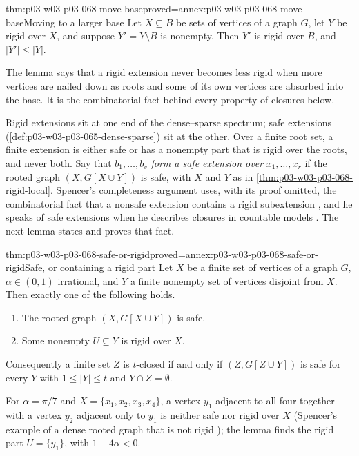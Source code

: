 \begin{hblemma}{thm:p03-w03-p03-068-move-base}{proved=annex:p03-w03-p03-068-move-base}{Moving to a larger base}
Let \(X\subseteq B\) be sets of vertices of a graph \(G\), let \(Y\) be rigid
over \(X\), and suppose \(Y'=Y\setminus B\) is nonempty.  Then \(Y'\) is
rigid over \(B\), and \(|Y'|\leq|Y|\).
\end{hblemma}

The lemma says that a rigid extension never becomes less rigid when more
vertices are nailed down as roots and some of its own vertices are absorbed
into the base.  It is the combinatorial fact behind every property of
closures below.

Rigid extensions sit at one end of the dense--sparse spectrum; safe
extensions (\cref{def:p03-w03-p03-065-dense-sparse}) sit at the other.
Over a finite root set, a finite extension is either safe or has a nonempty
part that is rigid over the roots, and never both.  Say that \(b_1,\ldots,b_v\) \emph{form a safe
extension over} \(x_1,\ldots,x_r\) if the rooted graph
\((X,G[X\cup Y])\) is safe, with \(X\) and \(Y\) as in
\cref{thm:p03-w03-p03-068-rigid-local}.  Spencer's completeness argument
uses, with its proof omitted, the combinatorial fact that a nonsafe
extension contains a rigid subextension
\cite[p.~12]{Spencer2007LogicRandomStructuresAuthor}, and he speaks of
safe extensions when he describes closures in countable models
\cite[p.~15]{Spencer2007LogicRandomStructuresAuthor}.  The next lemma
states and proves that fact.

\begin{hblemma}{thm:p03-w03-p03-068-safe-or-rigid}{proved=annex:p03-w03-p03-068-safe-or-rigid}{Safe, or containing a rigid part}
Let \(X\) be a finite set of vertices of a graph \(G\), \(\alpha\in(0,1)\)
irrational, and \(Y\) a finite nonempty set of vertices disjoint from \(X\).
Then exactly one of the following holds.
\begin{enumerate}
\item The rooted graph \((X,G[X\cup Y])\) is safe.
\item Some nonempty \(U\subseteq Y\) is rigid over \(X\).
\end{enumerate}
Consequently a finite set \(Z\) is \(t\)-closed if and only if
\((Z,G[Z\cup Y])\) is safe for every \(Y\) with \(1\leq|Y|\leq t\) and
\(Y\cap Z=\emptyset\).
\end{hblemma}

For \(\alpha=\pi/7\) and \(X=\{x_1,x_2,x_3,x_4\}\), a vertex \(y_1\)
adjacent to all four together with a vertex \(y_2\) adjacent only to \(y_1\)
is neither safe nor rigid over \(X\) (Spencer's example of a dense rooted
graph that is not rigid \cite[p.~7]{Spencer2007LogicRandomStructuresAuthor});
the lemma finds the rigid part \(U=\{y_1\}\), with \(1-4\alpha<0\).

